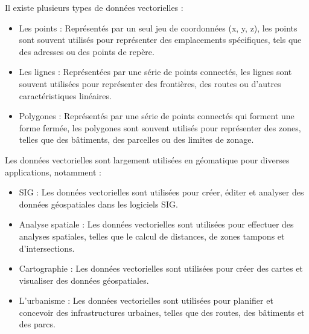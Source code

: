 Il existe plusieurs types de données vectorielles :
\begin{itemize}
    \item Les points : Représentés par un seul jeu de coordonnées (x, y, z), les points sont souvent utilisés pour représenter des emplacements spécifiques, tels que des adresses ou des points de repère.
    \item Les lignes : Représentées par une série de points connectés, les lignes sont souvent utilisées pour représenter des frontières, des routes ou d'autres caractéristiques linéaires.
    \item Polygones : Représentés par une série de points connectés qui forment une forme fermée, les polygones sont souvent utilisés pour représenter des zones, telles que des bâtiments, des parcelles ou des limites de zonage.
\end{itemize}

Les données vectorielles sont largement utilisées en géomatique pour diverses applications, notamment :
\begin{itemize}
    \item SIG : Les données vectorielles sont utilisées pour créer, éditer et analyser des données géospatiales dans les logiciels SIG.
    \item Analyse spatiale : Les données vectorielles sont utilisées pour effectuer des analyses spatiales, telles que le calcul de distances, de zones tampons et d'intersections.
    \item Cartographie : Les données vectorielles sont utilisées pour créer des cartes et visualiser des données géospatiales.
    \item L'urbanisme : Les données vectorielles sont utilisées pour planifier et concevoir des infrastructures urbaines, telles que des routes, des bâtiments et des parcs.
\end{itemize}

